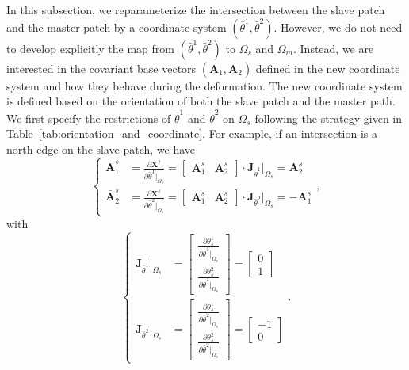 In this subsection, we reparameterize the intersection between the slave patch and the master patch by a coordinate system $(\bar{\theta}^1, \bar{\theta}^2)$. However, we do not need to develop explicitly the map from $(\bar{\theta}^1, \bar{\theta}^2)$ to $\Omega_s$ and $\Omega_m$. Instead, we are interested in the covariant base vectors $(\bar{\mathbf{A}}_1, \bar{\mathbf{A}}_2)$ defined in the new coordinate system and how they behave during the deformation. The new coordinate system is defined based on the orientation of both the slave patch and the master path. We first specify the restrictions of $\bar{\theta}^1$ and $\bar{\theta}^2$ on $\Omega_s$ following the strategy given in Table~\ref{tab:orientation_and_coordinate}. For example, if an intersection is a north edge on the slave patch, we have
\begin{equation}
	\left\{
	\begin{split}
		\bar{\mathbf{A}}^s_1 &= \frac{\partial\mathbf{X}^s}{\partial \bar{\theta}^1\vert_{\Omega_s}} = \begin{bmatrix}
			\mathbf{A}_1^s & \mathbf{A}_2^s
		\end{bmatrix} \cdot \mathbf{J}_{\bar{\theta}^1}\vert_{\Omega_s} = \mathbf{A}_2^s\\
		\bar{\mathbf{A}}_2^s &= \frac{\partial\mathbf{X}^s}{\partial \bar{\theta}^2\vert_{\Omega_s}} = \begin{bmatrix}
			\mathbf{A}_1^s & \mathbf{A}_2^s
		\end{bmatrix} \cdot \mathbf{J}_{\bar{\theta}^2}\vert_{\Omega_s} = -\mathbf{A}_1^s
	\end{split}
	\right.,
\end{equation}
with
\begin{equation}
	\left\{
	\begin{split}
		\mathbf{J}_{\bar{\theta}^1}\vert_{\Omega_s} &=
		\begin{bmatrix}
			\frac{\partial \theta^1_s}{\partial \bar{\theta}^1\vert_{\Omega_s}} \\
			\frac{\partial \theta^2_s}{\partial \bar{\theta}^1\vert_{\Omega_s}}
		\end{bmatrix}=
		\begin{bmatrix}
			0 \\
			1
		\end{bmatrix}\\
		\mathbf{J}_{\bar{\theta}^2}\vert_{\Omega_s} &= \begin{bmatrix}
			\frac{\partial \theta^1_s}{\partial \bar{\theta}^2\vert_{\Omega_s}} \\
			\frac{\partial \theta^2_s}{\partial \bar{\theta}^2\vert_{\Omega_s}}
		\end{bmatrix}=
		\begin{bmatrix}
			-1 \\
			0
		\end{bmatrix}
	\end{split}
	\right..
\end{equation}

